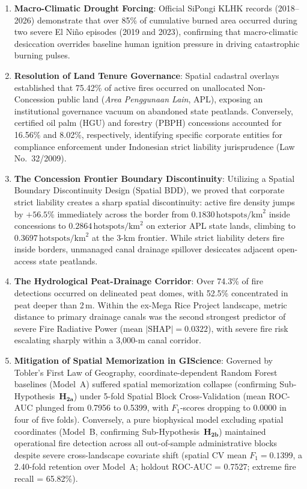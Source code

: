 \begin{enumerate}
    \item \textbf{Macro-Climatic Drought Forcing}: Official SiPongi KLHK records (2018--2026) demonstrate that over 85\% of cumulative burned area occurred during two severe El Ni\~no episodes (2019 and 2023), confirming that macro-climatic desiccation overrides baseline human ignition pressure in driving catastrophic burning pulses.
    \item \textbf{Resolution of Land Tenure Governance}: Spatial cadastral overlays established that 75.42\% of active fires occurred on unallocated Non-Concession public land (\textit{Area Penggunaan Lain}, APL), exposing an institutional governance vacuum on abandoned state peatlands. Conversely, certified oil palm (HGU) and forestry (PBPH) concessions accounted for 16.56\% and 8.02\%, respectively, identifying specific corporate entities for compliance enforcement under Indonesian strict liability jurisprudence (Law No.~32/2009).
    \item \textbf{The Concession Frontier Boundary Discontinuity}: Utilizing a Spatial Boundary Discontinuity Design (Spatial BDD), we proved that corporate strict liability creates a sharp spatial discontinuity: active fire density jumps by $+56.5\%$ immediately across the border from $0.1830\,\text{hotspots}/\text{km}^2$ inside concessions to $0.2864\,\text{hotspots}/\text{km}^2$ on exterior APL state lands, climbing to $0.3697\,\text{hotspots}/\text{km}^2$ at the 3-km frontier. While strict liability deters fire inside borders, unmanaged canal drainage spillover desiccates adjacent open-access state peatlands.
    \item \textbf{The Hydrological Peat-Drainage Corridor}: Over 74.3\% of fire detections occurred on delineated peat domes, with 52.5\% concentrated in peat deeper than 2\,m. Within the ex-Mega Rice Project landscape, metric distance to primary drainage canals was the second strongest predictor of severe Fire Radiative Power ($\text{mean } |\text{SHAP}| = 0.0322$), with severe fire risk escalating sharply within a 3,000-m canal corridor.
    \item \textbf{Mitigation of Spatial Memorization in GIScience}: Governed by Tobler's First Law of Geography, coordinate-dependent Random Forest baselines (Model~A) suffered spatial memorization collapse (confirming Sub-Hypothesis~$\mathbf{H_{2a}}$) under 5-fold Spatial Block Cross-Validation (mean ROC-AUC plunged from 0.7956 to 0.5399, with $F_1$-scores dropping to 0.0000 in four of five folds). Conversely, a pure biophysical model excluding spatial coordinates (Model~B, confirming Sub-Hypothesis~$\mathbf{H_{2b}}$) maintained operational fire detection across all out-of-sample administrative blocks despite severe cross-landscape covariate shift (spatial CV mean $F_1 = 0.1399$, a 2.40-fold retention over Model~A; holdout ROC-AUC = 0.7527; extreme fire recall = 65.82\%).
\end{enumerate}

